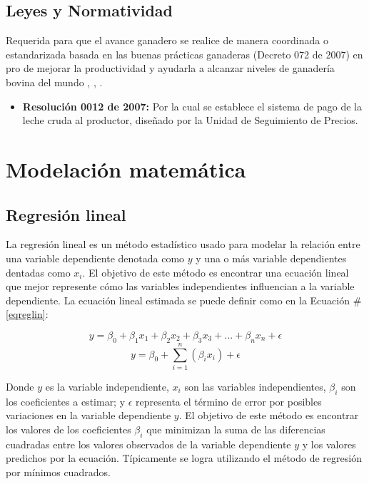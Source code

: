 \subsection{Leyes y Normatividad}  \label{leyes}
Requerida para que el avance ganadero se realice de manera coordinada o estandarizada basada en las buenas prácticas ganaderas (Decreto 072 de 2007) en pro de mejorar la productividad y ayudarla a alcanzar niveles de ganadería bovina del mundo \cite{invima}, \cite{leylacteos}, \cite{minsaludleche}.
\begin{itemize}
	\item \textbf{Resolución 0012 de 2007:} Por la cual se establece el sistema de pago de la leche cruda al productor, diseñado por la Unidad de Seguimiento de Precios.

\end{itemize}

\section{Modelación matemática} \label{modmatsec}

\subsection{Regresión lineal}
La regresión lineal es un método estadístico usado para modelar la relación entre una variable dependiente denotada como $y$ y una o más variable dependientes dentadas como $x_{i}$. El objetivo de este método es encontrar una ecuación lineal que mejor represente cómo las variables independientes influencian a la variable dependiente. La ecuación lineal estimada se puede definir como en la Ecuación \#\ref{eqreglin}:

\begin{equation*}
    y = \beta_{0} + \beta_{1}x_{1} + \beta_{2}x_{2} + \beta_{3}x_{3} + ... + \beta_{n}x_{n} + \epsilon
\end{equation*}
\begin{equation}
    y = \beta_{0} + \sum_{i=1}^{n}(\beta_{i}x_{i}) + \epsilon \label{eqreglin}
\end{equation}

Donde $y$ es la variable independiente, $x_{i}$ son las variables independientes, $\beta_{i}$ son los coeficientes a estimar; y $\epsilon$ representa el término de error por posibles variaciones en la variable dependiente $y$. El objetivo de este método es encontrar los valores de los coeficientes $\beta_{i}$ que minimizan la suma de las diferencias cuadradas entre los valores observados de la variable dependiente $y$ y los valores predichos por la ecuación. Típicamente se logra utilizando el método de regresión por mínimos cuadrados.

